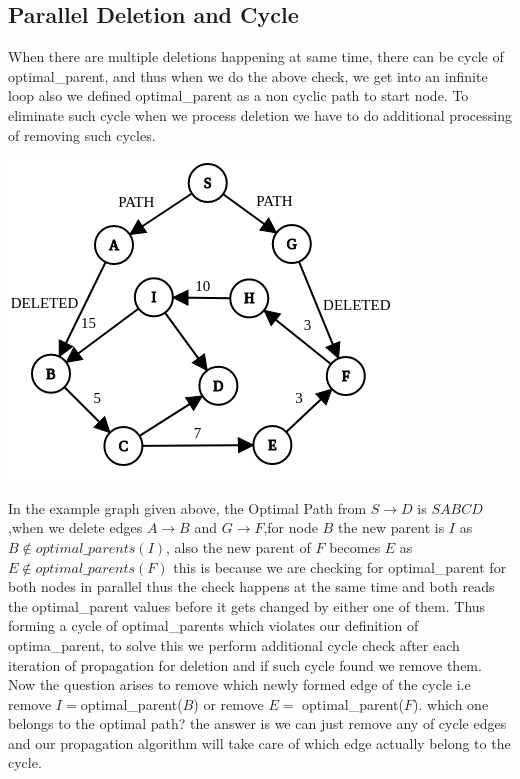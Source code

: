 \documentclass[a4paper]{article}
\begin{document}
\subsection{Parallel Deletion and Cycle}
When there are multiple deletions happening at same time, there can be cycle of optimal\_parent, and thus when we do the above check, we get into an infinite loop also we defined optimal\_parent as a non cyclic path to start node. To eliminate such cycle when we process deletion we have to do additional processing of removing such cycles.\\
\begin{center}
\includegraphics[scale=0.45]{img/Delete_cycle.png}        
\end{center}
In the example graph given above, the Optimal Path from $S\rightarrow D$ is $SABCD$,when we delete edges $A \rightarrow B$ and $G \rightarrow F$,for node $B$ the new parent is $I$ as $B \notin optimal\_parents(I)$, also the new parent of $F$ becomes $E$ as $E \notin optimal\_parents(F)$ this is because we are checking for optimal\_parent for both nodes in parallel thus the check happens at the same time and both reads the optimal\_parent values before it gets changed by either one of them. Thus forming a cycle of optimal\_parents which violates our definition of optima\_parent, to solve this we perform additional cycle check after each iteration of propagation for deletion and if such cycle found we remove them.\\
Now the question arises to remove which newly formed edge of the cycle i.e remove $I= $optimal\_parent($B$) or remove $E=$ optimal\_parent($F$). which one belongs to the optimal path? the answer is we can just remove any of cycle edges and our propagation algorithm will take care of which edge actually belong to the cycle.\\
\end{document}
